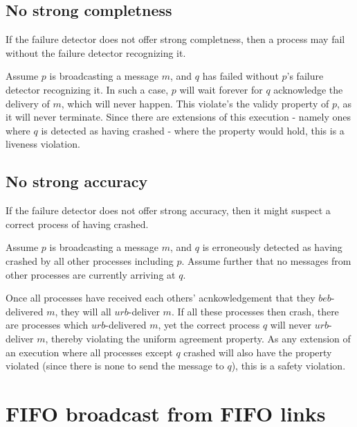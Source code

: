 \documentclass[a4paper]{scrreprt}
\begin{document}
\subsection{No strong completness}

If the failure detector does not offer strong completness, then a process may
fail without the failure detector recognizing it.

Assume $p$ is broadcasting a message $m$, and $q$ has failed without $p$'s
failure detector recognizing it. In such a case, $p$ will wait forever for $q$
acknowledge the delivery of $m$, which will never happen. This violate's the
validy property of $p$, as it will never terminate. Since there are extensions
of this execution - namely ones where $q$ is detected as having crashed - where
the property would hold, this is a liveness violation.

\subsection{No strong accuracy}

If the failure detector does not offer strong accuracy, then it might suspect a
correct process of having crashed.

Assume $p$ is broadcasting a message $m$, and $q$ is erroneously detected as
having crashed by all other processes including $p$. Assume further that no
messages from other processes are currently arriving at $q$.

Once all processes have received each others' acnkowledgement that they
$beb$-delivered $m$, they will all $urb$-deliver $m$. If all these processes
then crash, there are processes which $urb$-delivered $m$, yet the correct
process $q$ will never $urb$-deliver $m$, thereby violating the uniform
agreement property. As any extension of an execution where all processes except
$q$ crashed will also have the property violated (since there is none to send
the message to $q$), this is a safety violation.

\section{FIFO broadcast from FIFO links}
\end{document}
